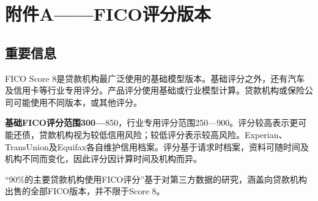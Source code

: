 \documentclass[UTF8,fontset=none,11pt,a4paper]{ctexart}
\begin{document}
\section*{附件A——FICO评分版本}
\subsection*{重要信息}
FICO Score 8是贷款机构最广泛使用的基础模型版本。基础评分之外，还有汽车及信用卡等行业专用评分。产品评分使用基础或行业模型计算。贷款机构或保险公司可能使用不同版本，或\allowbreak\mbox{其他评分。}


\textbf{基础FICO评分范围300—}850，行业专用评分范围250—900。评分较高表示更可能还债，贷款机构视为较低信用风险；较低评分表示较高风险。Experian、TransUnion及Equifax各自维护信用档案。评分基于请求时档案，资料可随时间及机构不同而变化，因此评分因计算时间及\allowbreak\mbox{机构而异。}


“90\%的主要贷款机构使用FICO评分”基于对第三方数据的研究，涵盖向贷款机构出售的全部FICO版本，并不限于Score 8。
\end{document}
